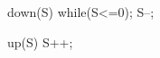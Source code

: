 \documentclass[varwidth=15em,crop]{standalone}
\begin{document}
\begin{minipage}[t]{.6\linewidth}
\begin{ccode}
down(S){
  while(S<=0);
  S--;
}      
\end{ccode}
\end{minipage}\hfill
\begin{minipage}[t]{.3\linewidth}
\begin{ccode}
up(S){
  S++;
}      
\end{ccode}
\end{minipage}
\end{document}
